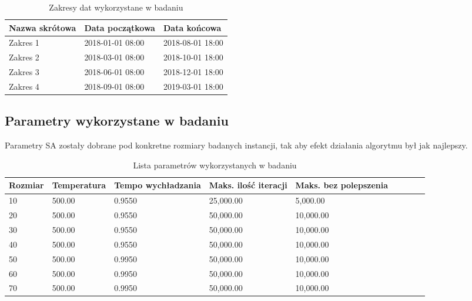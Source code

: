 \begin{table}[H]
    \centering
    \begin{tabular}[width=\textwidth]{ | l | l | l |}
        \hline
        \bfseries Nazwa skrótowa & \bfseries Data początkowa & \bfseries Data końcowa \\
        \hline
        Zakres 1 & 2018-01-01 08:00 & 2018-08-01 18:00 \\
        \hline
        Zakres 2 & 2018-03-01 08:00 & 2018-10-01 18:00 \\
        \hline
        Zakres 3 & 2018-06-01 08:00 & 2018-12-01 18:00 \\
        \hline
        Zakres 4 & 2018-09-01 08:00 & 2019-03-01 18:00 \\
        \hline
    \end{tabular}
    \caption{Zakresy dat wykorzystane w badaniu}
\end{table}

\subsection{Parametry wykorzystane w badaniu}
Parametry SA zostały dobrane pod konkretne rozmiary badanych instancji, tak aby efekt
działania algorytmu był jak najlepszy.

\begin{table}[H]
\centering
\begin{tabular}[\textwidth]{ | l | l | l | l | l | l | l | l | l | }
\hline
\bfseries Rozmiar & \bfseries Temperatura & \bfseries Tempo wychładzania
	     & \bfseries Maks. ilość iteracji & \bfseries Maks. bez polepszenia\\
\hline
10 & 500.00 & 0.9550 & 25,000.00 & 5,000.00 \\
\hline
20 & 500.00 & 0.9550 & 50,000.00 & 10,000.00 \\
\hline
30 & 500.00 & 0.9550 & 50,000.00 & 10,000.00 \\
\hline
40 & 500.00 & 0.9550 & 50,000.00 & 10,000.00 \\
\hline
50 & 500.00 & 0.9950 & 50,000.00 & 10,000.00 \\
\hline
60 & 500.00 & 0.9950 & 50,000.00 & 10,000.00 \\
\hline
70 & 500.00 & 0.9950 & 50,000.00 & 10,000.00 \\
\hline
\end{tabular}
\caption{Lista parametrów wykorzystanych w badaniu}
\end{table}

\newpage
